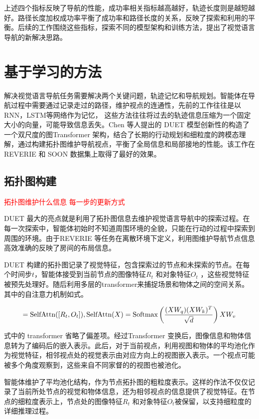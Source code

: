 \documentclass[bachelor]{thesis-uestc}
\begin{document}
上述四个指标反映了导航的性能，成功率相关指标越高越好，轨迹长度则是越短越好。路径长度加权成功率平衡了成功率和路径长度的关系，反映了探索和利用的平衡。后续的工作围绕这些指标，探索不同的模型架构和训练方法，提出了视觉语言导航的新解决思路。

\section{基于学习的方法}

解决视觉语言导航任务需要解决两个关键问题，轨迹记忆和导航规划。智能体在导航过程中需要通过记录走过的路径，维护视点的连通性，先前的工作往往是以RNN，LSTM等网络作为记忆， 这些方法往往将过去的轨迹信息压缩为一个固定大小的向量，可能导致信息丢失。Chen 等人提出的 DUET 模型创新性的构造了一个双尺度的图Transformer 架构，结合了长期的行动规划和细粒度的跨模态理解，通过构建拓扑图维护导航视点，平衡了全局信息和局部接地的性能。该工作在REVERIE 和 SOON 数据集上取得了最好的效果。

\subsection{拓扑图构建}

\textcolor{red}{拓扑图维护什么信息 每一步的更新方式}

DUET 最大的亮点就是利用了拓扑图信息去维护视觉语言导航中的探索过程。在每一次探索中，智能体初始时不知道周围环境的全貌，只能在行动的过程中探索到周围的环境。由于REVERIE 等任务在离散环境下定义，利用图维护导航节点信息高效准确的反映了房间的布局信息。

DUET 构建的拓扑图记录了视觉特征，包含探索过的节点和未探索的节点。在每个时间步$t$，智能体接受到当前节点的图像特征$R_t$ 和对象特征$O_t$ ，这些视觉特征被预先处理好。随后利用多层的transformer来捕捉场景和物体之间的空间关系。其中的自注意力机制如式。

\begin{equation}
    [R'_{t}, O'_{t}] = \text{SelfAttn}([R_{t}, O_{t}]), \\
    \text{SelfAttn}(X) = \text{Softmax}\left( \frac{(XW_{q})(XW_{k})^{T}}{\sqrt{d}} \right) XW_{v}
\label{SelfAttn}
\end{equation}

式中的 transformer 省略了偏差项。经过Transformer 变换后，图像信息和物体信息转为了编码后的嵌入表示。此后，对于当前视点，利用视图和物体的平均池化作为视觉特征，相邻视点处的视觉表示由对应方向上的视图嵌入表示。一个视点可能被多个角度观察到，这些来自不同家督的的视图也被池化。

智能体维护了平均池化结构，作为节点拓扑图的粗粒度表示。这样的作法不仅仅记录了当前所处节点的视觉和物体信息，还为相邻视点的信息提供了视觉特征。在节点的细粒度表示上，节点处的图像特征$R_t$ 和对象特征$O_t$被保留，以支持细粒度的详细推理过程。
\end{document}

